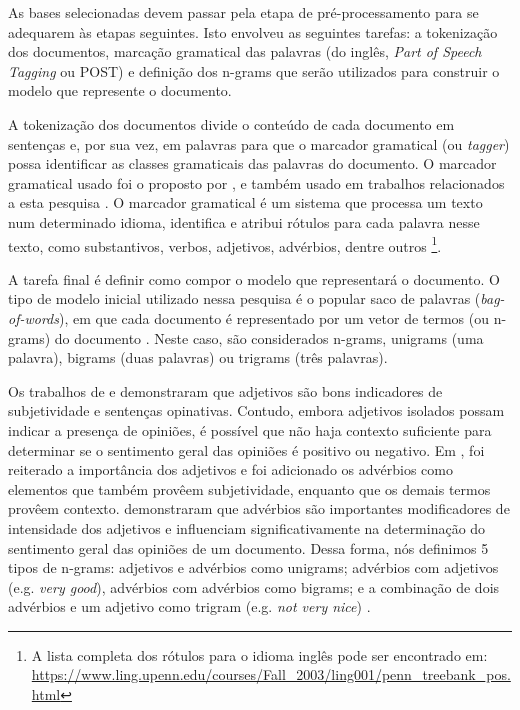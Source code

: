 \documentclass[template.tex]{subfiles}
\begin{document}
As bases selecionadas devem passar pela etapa de pré-processamento para se adequarem às etapas seguintes. Isto envolveu as seguintes tarefas: a tokenização dos documentos, marcação gramatical das palavras (do inglês, \textit{Part of Speech Tagging} ou POST) e definição dos n-grams que serão utilizados para construir o modelo que represente o documento. 

A tokenização dos documentos divide o conteúdo de cada documento em sentenças e, por sua vez, em palavras para que o marcador gramatical (ou \textit{tagger}) possa identificar as classes gramaticais das palavras do documento. O marcador gramatical usado foi o proposto por , e também usado em trabalhos relacionados a esta pesquisa \cite{chaovalit2005movie, taboada2008extracting, taboada2011lexicon}. O marcador gramatical é um sistema que processa um texto num determinado idioma, identifica e atribui rótulos para cada palavra nesse texto, como substantivos, verbos, adjetivos, advérbios, dentre outros \footnote{A lista completa dos rótulos para o idioma inglês pode ser encontrado em: \url{https://www.ling.upenn.edu/courses/Fall_2003/ling001/penn_treebank_pos.html}}. 


A tarefa final é definir como compor o modelo que representará o documento. O tipo de modelo inicial utilizado nessa pesquisa é o popular saco de palavras (\textit{bag-of-words}), em que cada documento é representado por um vetor de termos (ou n-grams) do documento \cite{moraes2012document}. Neste caso, são considerados n-grams, unigrams (uma palavra), bigrams (duas palavras) ou trigrams (três palavras). 

Os trabalhos de  e  demonstraram que adjetivos são bons indicadores de subjetividade e sentenças opinativas. Contudo, embora adjetivos isolados possam indicar a presença de opiniões, é possível que não haja contexto suficiente para determinar se o sentimento geral das opiniões é positivo ou negativo. Em , foi reiterado a importância dos adjetivos e  foi adicionado os advérbios como elementos que também provêem subjetividade, enquanto que os demais termos provêem contexto.  demonstraram que advérbios são importantes modificadores de intensidade dos adjetivos e influenciam significativamente na determinação do sentimento geral das opiniões de um documento. Dessa forma, nós definimos 5 tipos de n-grams: adjetivos e advérbios como unigrams; advérbios com adjetivos (e.g. \textit{very good}), advérbios com advérbios como bigrams; e a combinação de dois advérbios e um adjetivo como trigram (e.g. \textit{not very nice}) \cite{pang2002thumbs, turney2002thumbs, taboada2008extracting, karamibekr2012verb}. 
\end{document}
